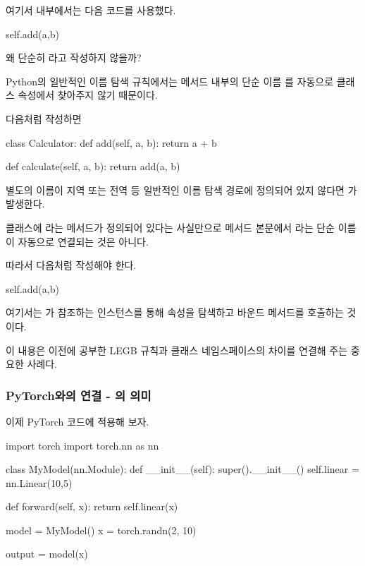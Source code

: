 여기서  내부에서는 다음 코드를 사용했다.

\begin{dhkcode}
self.add(a,b)
\end{dhkcode}

왜 단순히 라고 작성하지 않을까?

Python의 일반적인 이름 탐색 규칙에서는 메서드 내부의 단순 이름 를 자동으로 클래스 속성에서 찾아주지 않기 때문이다.

다음처럼 작성하면

\begin{dhkcode}
class Calculator:
    def add(self, a, b):
        return a + b

    def calculate(self, a, b):
        return add(a, b)
\end{dhkcode}

별도의  이름이 지역 또는 전역 등 일반적인 이름 탐색 경로에 정의되어 있지 않다면 가 발생한다.

클래스에 라는 메서드가 정의되어 있다는 사실만으로 메서드 본문에서 라는 단순 이름이 자동으로 연결되는 것은 아니다.

따라서 다음처럼 작성해야 한다.

\begin{dhkcode}
self.add(a,b)
\end{dhkcode}

여기서는 가 참조하는 인스턴스를 통해  속성을 탐색하고 바운드 메서드를 호출하는 것이다.

이 내용은 이전에 공부한 LEGB 규칙과 클래스 네임스페이스의 차이를 연결해 주는 중요한 사례다.

\subsubsection{PyTorch와의 연결 - 의 의미}

이제 PyTorch 코드에 적용해 보자.

\begin{dhkcode}
import torch
import torch.nn as nn

class MyModel(nn.Module):
    def __init__(self):
        super().__init__()
        self.linear = nn.Linear(10,5)

    def forward(self, x):
        return self.linear(x)

model = MyModel()
x = torch.randn(2, 10)

output = model(x)
\end{dhkcode}

